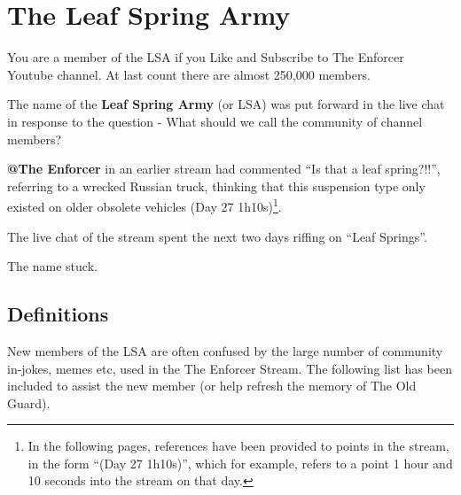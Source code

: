 \documentclass[11pt]{book}
\begin{document}
\chapter{The Leaf Spring Army}

You are a member of the LSA if you Like and Subscribe to The Enforcer Youtube channel.
At last count there are almost 250,000 members.

The name of the \textbf{Leaf Spring Army} (or LSA) was put forward in the live chat
in response to the question - What should we call the community of channel members? 

\textbf{@The Enforcer} in an earlier stream had commented ``Is that a leaf spring?!!'',
referring to a wrecked Russian truck, thinking that this suspension type only existed on
older obsolete vehicles (Day 27 1h10s)\footnote{In the following pages, references have been provided to points 
in the stream, in the form ``(Day 27 1h10s)'', which for example,
refers to a point 1 hour and 10 seconds into the stream on that day.}.

The live chat of the stream spent the next two days riffing on ``Leaf Springs''.

The name stuck.



\clearpage


\section{Definitions}

New members of the LSA are often confused by the large number of community in-jokes, memes etc, 
used in the The Enforcer Stream. The following list has been included to assist the new 
member (or help refresh the memory of The Old Guard).
\end{document}
